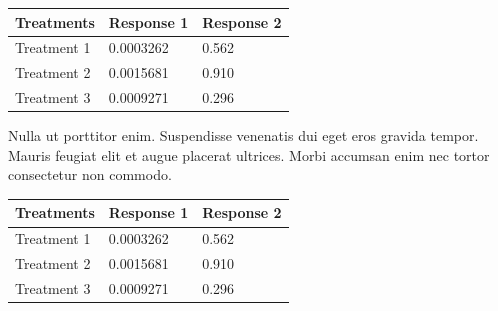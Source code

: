 \documentclass[landscape,archE,fontscale=0.285]{baposter} %
\begin{document}
\begin{poster}
{\begin{center}
\begin{tabular}{l l l}
\toprule
\textbf{Treatments} & \textbf{Response 1} & \textbf{Response 2}\\
\midrule
Treatment 1 & 0.0003262 & 0.562 \\
Treatment 2 & 0.0015681 & 0.910 \\
Treatment 3 & 0.0009271 & 0.296 \\
\bottomrule
\end{tabular}
\end{center}

Nulla ut porttitor enim. Suspendisse venenatis dui eget eros gravida tempor. Mauris feugiat elit et augue placerat ultrices. Morbi accumsan enim nec tortor consectetur non commodo.

\begin{center}
\begin{tabular}{l l l}
\toprule
\textbf{Treatments} & \textbf{Response 1} & \textbf{Response 2}\\
\midrule
Treatment 1 & 0.0003262 & 0.562 \\
Treatment 2 & 0.0015681 & 0.910 \\
Treatment 3 & 0.0009271 & 0.296 \\
\bottomrule
\end{tabular}
\end{center}
}


\end{poster}
\end{document}

